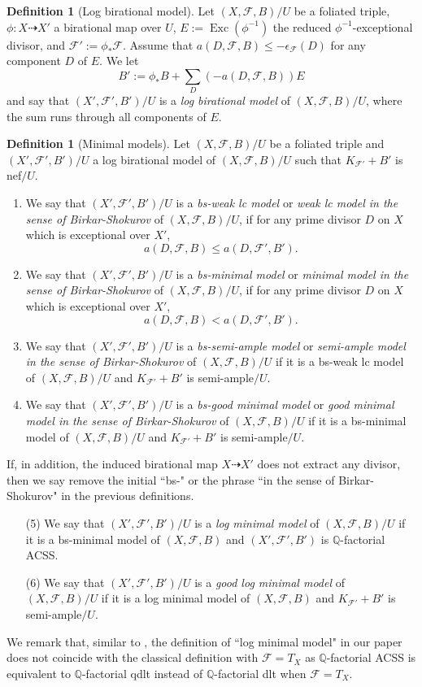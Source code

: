 \documentclass[11pt]{amsart}
\numberwithin{equation}{section}
\newcommand{\Qq}{\mathbb{Q}}
\newcommand{\Exc}{\operatorname{Exc}}
\newcommand{\Ff}{\mathcal{F}}
\theoremstyle{definition}
\newtheorem{defn}[thm]{Definition}
\theoremstyle{definition}
\theoremstyle{definition}
\begin{document}
\begin{defn}[Log birational model]\label{defn: log birational model}
  Let $(X,\Ff,B)/U$ be a foliated triple, $\phi: X\dashrightarrow X'$ a birational map over $U$, $E:=\Exc(\phi^{-1})$ the reduced $\phi^{-1}$-exceptional divisor, and $\Ff':=\phi_*\Ff$. Assume that $a(D,\Ff,B)\leq-\epsilon_{\Ff}(D)$ for any component $D$ of $E$. We let
  $$B':=\phi_*B+\sum_D(-a(D,\Ff,B))E$$
and say that $(X',\Ff',B')/U$ is a \emph{log birational model} of $(X,\Ff,B)/U$, where the sum runs through all components of $E$.
\end{defn}

\begin{defn}[Minimal models]\label{defn: minimal model}
    Let $(X,\Ff,B)/U$ be a foliated triple and $(X',\Ff',B')/U$ a log birational model of $(X,\Ff,B)/U$ such that $K_{\Ff'}+B'$ is nef$/U$. 
    \begin{enumerate}
        \item We say that $(X',\Ff',B')/U$ is a \emph{bs-weak lc model} or \emph{weak lc model in the sense of Birkar-Shokurov} of $(X,\Ff,B)/U$, if for any prime divisor $D$ on $X$ which is exceptional over $X'$, $$a(D,\Ff,B)\leq a(D,\Ff',B').$$
        \item We say that $(X',\Ff',B')/U$ is a \emph{bs-minimal model} or \emph{minimal model in the sense of Birkar-Shokurov} of $(X,\Ff,B)/U$, if for any prime divisor $D$ on $X$ which is exceptional over $X'$, $$a(D,\Ff,B)<a(D,\Ff',B').$$
          \item We say that $(X',\Ff',B')/U$ is a \emph{bs-semi-ample model} or \emph{semi-ample model in the sense of Birkar-Shokurov} of $(X,\Ff,B)/U$ if it is a bs-weak lc model of $(X,\Ff,B)/U$ and $K_{\Ff'}+B'$ is semi-ample$/U$. 
        \item We say that $(X',\Ff',B')/U$ is a \emph{bs-good minimal model} or \emph{good minimal model in the sense of Birkar-Shokurov} of $(X,\Ff,B)/U$ if it is a bs-minimal model of $(X,\Ff,B)/U$ and $K_{\Ff'}+B'$ is semi-ample$/U$. 
        \end{enumerate}
If, in addition, the induced birational map $X\dashrightarrow X'$ does not extract any divisor, then we say remove the initial ``bs-" or the phrase ``in the sense of Birkar-Shokurov" in the previous definitions. 
\begin{enumerate}
        \item[(5)] We say that $(X',\Ff',B')/U$ is a \emph{log minimal model} of $(X,\Ff,B)/U$ if it is a bs-minimal model of $(X,\Ff,B)$ and $(X',\Ff',B')$ is $\Qq$-factorial ACSS.
        \item[(6)] We say that $(X',\Ff',B')/U$ is a \emph{good log minimal model} of $(X,\Ff,B)/U$ if it is a log minimal model of $(X,\Ff,B)$ and $K_{\Ff'}+B'$ is semi-ample$/U$. 
\end{enumerate}

We remark that, similar to \cite{CHLX23}, the definition of ``log minimal model" in our paper does not coincide with the classical definition with $\Ff=T_X$ as $\Qq$-factorial ACSS is equivalent to $\Qq$-factorial qdlt instead of $\Qq$-factorial dlt when $\Ff=T_X$. 
\end{defn}
\end{document}
